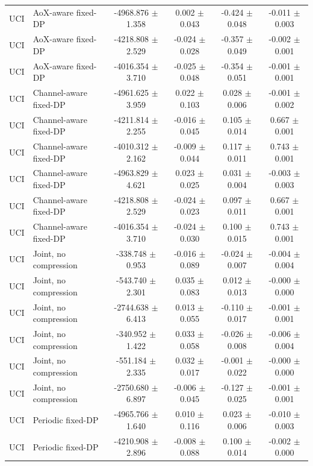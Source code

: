 \begin{tabular}{llcccc}
UCI & AoX-aware fixed-DP & -4968.876 $\pm$ 1.358 & 0.002 $\pm$ 0.043 & -0.424 $\pm$ 0.048 & -0.011 $\pm$ 0.003 \\
UCI & AoX-aware fixed-DP & -4218.808 $\pm$ 2.529 & -0.024 $\pm$ 0.028 & -0.357 $\pm$ 0.049 & -0.002 $\pm$ 0.001 \\
UCI & AoX-aware fixed-DP & -4016.354 $\pm$ 3.710 & -0.025 $\pm$ 0.048 & -0.354 $\pm$ 0.051 & -0.001 $\pm$ 0.001 \\
UCI & Channel-aware fixed-DP & -4961.625 $\pm$ 3.959 & 0.022 $\pm$ 0.103 & 0.028 $\pm$ 0.006 & -0.001 $\pm$ 0.002 \\
UCI & Channel-aware fixed-DP & -4211.814 $\pm$ 2.255 & -0.016 $\pm$ 0.045 & 0.105 $\pm$ 0.014 & 0.667 $\pm$ 0.001 \\
UCI & Channel-aware fixed-DP & -4010.312 $\pm$ 2.162 & -0.009 $\pm$ 0.044 & 0.117 $\pm$ 0.011 & 0.743 $\pm$ 0.001 \\
UCI & Channel-aware fixed-DP & -4963.829 $\pm$ 4.621 & 0.023 $\pm$ 0.025 & 0.031 $\pm$ 0.004 & -0.003 $\pm$ 0.003 \\
UCI & Channel-aware fixed-DP & -4218.808 $\pm$ 2.529 & -0.024 $\pm$ 0.023 & 0.097 $\pm$ 0.011 & 0.667 $\pm$ 0.001 \\
UCI & Channel-aware fixed-DP & -4016.354 $\pm$ 3.710 & -0.024 $\pm$ 0.030 & 0.100 $\pm$ 0.015 & 0.743 $\pm$ 0.001 \\
UCI & Joint, no compression & -338.748 $\pm$ 0.953 & -0.016 $\pm$ 0.089 & -0.024 $\pm$ 0.007 & -0.004 $\pm$ 0.004 \\
UCI & Joint, no compression & -543.740 $\pm$ 2.301 & 0.035 $\pm$ 0.083 & 0.012 $\pm$ 0.013 & -0.000 $\pm$ 0.000 \\
UCI & Joint, no compression & -2744.638 $\pm$ 6.413 & 0.013 $\pm$ 0.055 & -0.110 $\pm$ 0.017 & -0.001 $\pm$ 0.001 \\
UCI & Joint, no compression & -340.952 $\pm$ 1.422 & 0.033 $\pm$ 0.058 & -0.026 $\pm$ 0.008 & -0.006 $\pm$ 0.004 \\
UCI & Joint, no compression & -551.184 $\pm$ 2.335 & 0.032 $\pm$ 0.017 & -0.001 $\pm$ 0.022 & -0.000 $\pm$ 0.000 \\
UCI & Joint, no compression & -2750.680 $\pm$ 6.897 & -0.006 $\pm$ 0.045 & -0.127 $\pm$ 0.025 & -0.001 $\pm$ 0.001 \\
UCI & Periodic fixed-DP & -4965.766 $\pm$ 1.640 & 0.010 $\pm$ 0.116 & 0.023 $\pm$ 0.006 & -0.010 $\pm$ 0.003 \\
UCI & Periodic fixed-DP & -4210.908 $\pm$ 2.896 & -0.008 $\pm$ 0.088 & 0.100 $\pm$ 0.014 & -0.002 $\pm$ 0.000 \\

\end{tabular}
